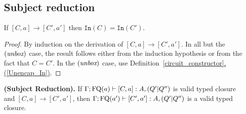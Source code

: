 \documentclass[twoside]{article}
\begin{document}
\subsection{Subject reduction}

\begin{lemma}
\label{Inwires}
If $[C,a]\to[C',a']$ then $\mathtt{In}(C)=\mathtt{In}(C')$.
\end{lemma}

\begin{proof}
By induction on the derivation of $[C,a]\to[C',a']$. 
In all but the $(\mathop{\textit{unbox}}\nolimits)$ case, the result follows either from the induction 
hypothesis or from the fact that $C=C'$. In the $(\mathop{\textit{unbox}}\nolimits)$ case, use 
Definition~\hyperref[Unencap_In]{\ref*{circuit_constructor}.(\ref*{Unencap_In})}.
\end{proof}

\begin{proposition}
{\bf (Subject Reduction).}
\label{subject_red_one_step}
If $\Gamma;\mathop{\textrm{FQ}}\nolimits(a)\vdash [C,a]:A,(Q'|Q'')$ is valid typed closure 
and $[C,a]\to [C',a']$, then $\Gamma;\mathop{\textrm{FQ}}\nolimits(a')\vdash [C',a']:A,(Q'|Q'')$ is 
a valid typed closure.
\end{proposition}
\end{document}
